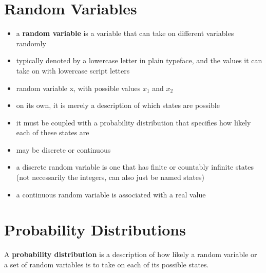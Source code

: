 \documentclass[11pt, twocolumn]{report}
\begin{document}
\section{Random Variables}
\begin{itemize}
  \item a \textbf{random variable} is a variable that can take on different
    variables randomly
  \item typically denoted by a lowercase letter in plain typeface, and the
    values it can take on with lowercase script letters
  \item random variable x, with possible values $x_1$ and $x_2$
  \item on its own, it is merely a description of which states are possible 
  \item it must be coupled with a probability distribution that specifies how
    likely each of these states are
  \item may be discrete or continuous
  \item a discrete random variable is one that has finite or countably
    infinite states (not necessarily the integers, can also just be named
    states)
  \item a continuous random variable is associated with a real value
\end{itemize}

\section{Probability Distributions}
A \textbf{probability distribution} is a description of how likely a random
variable or a set of random variables is to take on each of its possible
states.
\end{document}
